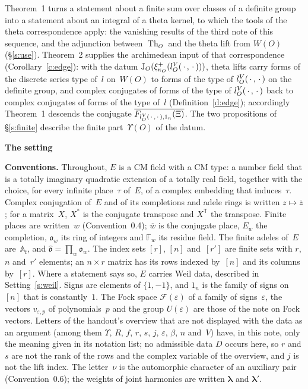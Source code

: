 \documentclass[11pt,a4paper]{article}
\newcommand{\m}[1]{\mbox{$#1$}}        %
\newcommand{\sect}[2]{\refstepcounter{section}\label{#2}\par\addvspace{19pt plus 4pt minus 2pt}\Needspace{7\baselineskip}%
  \noindent\llap{{\fontsize{13.2}{16}\selectfont\bfseries\color{inkfaint}\thesection}\hspace{9pt}}%
  {\fontsize{13.2}{16}\selectfont\bfseries\color{ink}#1}\par\nopagebreak\vspace{-1pt}}
\theoremstyle{plainx}
\theoremstyle{uprightx}
\newenvironment{conventions}{\par\addvspace{5pt}\noindent\textbf{Conventions.}\enspace\ignorespaces}{\par\addvspace{3pt}}
\newcommand{\AAf}{\mathbb{A}_{\mathrm{f}}}
\newcommand{\FF}{\mathbb{F}}
\newcommand{\oo}{\mathfrak{o}}
\newcommand{\ohat}{\hat{\mathfrak{o}}}
\newcommand{\one}[1]{1_{#1}}
\newcommand{\WO}[1]{W(#1)}
\newcommand{\kap}[1]{\kappa_{#1}}
\newcommand{\Ups}[1]{\Upsilon(#1)}
\newcommand{\JO}[2]{\operatorname{J}_{#1}(#2)}
\newcommand{\vplus}[2]{\xi^{+}_{#1}(#2)}
\newcommand{\algF}[3]{F_{#1,#2}(#3)}
\newcommand{\conj}[1]{\overline{#1}}
\begin{document}
Theorem~1 turns a statement about a finite sum over classes of a definite group into a statement about an
integral of a theta kernel, to which the tools of the theta correspondence apply: the vanishing results of the
third note of this sequence, and the adjunction between \m{\operatorname{Th}_{O}} and the theta lift from
\m{\WO{O}} (§\ref{s:use}). Theorem~2 supplies the archimedean input of that correspondence
(Corollary~\ref{c:edge}): with the datum \m{\JO{O}{\vplus{\kap{O}}{\paramV{O}{\,\cdot\,}{\,\cdot\,}}}}, theta lifts carry forms of the
discrete series type of~$l$ on~$\WO{O}$ to forms of the type of \m{\paramV{O}{\,\cdot\,}{\,\cdot\,}} on the definite group,
and complex conjugates of forms of the type of \m{\paramV{O}{\,\cdot\,}{\,\cdot\,}} back to complex conjugates of
forms of the type of~$l$ (Definition~\ref{d:edge}); accordingly Theorem~1 descends the conjugate
\m{\conj{\algF{\paramV{O}{\,\cdot\,}{\,\cdot\,}}{\one{n}}{\Xi}}}.
The two propositions of §\ref{s:finite} describe the finite part~$\Ups{O}$ of the datum.

\sect{The setting}{s:setting}
\begin{conventions}\label{c:conventions}
Throughout, $E$ is a CM field with a CM type: a number field that is a totally imaginary quadratic extension of a
totally real field, together with the choice, for every infinite place~$\tau$ of~$E$, of a complex embedding that
induces~$\tau$. Complex conjugation of~$E$ and of its completions and adele rings is written \m{z\mapsto\conj{z}};
for a matrix~$X$, \m{X^{*}} is the conjugate transpose and \m{X^{\mathsf{T}}} the transpose. Finite places are
written~$w$ (Convention~0.4); \m{\conj{w}} is the conjugate place, $E_{w}$ the completion, \m{\oo_{w}} its ring of integers and
\m{\FF_{w}} its residue field. The finite adeles of~$E$ are~\m{\AAf}, and \m{\ohat=\prod_{w}\oo_{w}}. The index sets
$[r]$, $[n]$ and~$[r']$ are finite sets with $r$, $n$ and~$r'$ elements; an \m{n\times r} matrix has its rows
indexed by~$[n]$ and its columns by~$[r]$. Where a statement says so, $E$ carries Weil data, described in
Setting~\ref{s:weil}. Signs are elements of \m{\{1,-1\}}, and \m{\one{n}} is the family of signs on~$[n]$ that is
constantly~$1$. The Fock space \m{\mathcal{F}(\varepsilon)} of a family of signs~$\varepsilon$, the vectors
\m{v_{\varepsilon,p}} of polynomials~$p$ and the group $U(\varepsilon)$ are those of the note on Fock vectors.
Letters of the handout's overview that are not displayed with the data as an argument (among them $\Upsilon$,
$R$, $f$, $r$, $s$, $j$, $\varepsilon$, $\beta$, $n$ and~$V$) have, in this note, only the meaning given in its notation
list; no admissible data $D$ occurs here, so $r$ and $s$ are not the rank of the rows and the complex variable of the
overview, and $j$ is not the lift index. The letter~$\nu$ is the automorphic character of an auxiliary pair
(Convention~0.6); the weights of joint harmonics are written
$\boldsymbol{\lambda}$ and $\boldsymbol{\lambda}'$.
\end{conventions}
\end{document}
